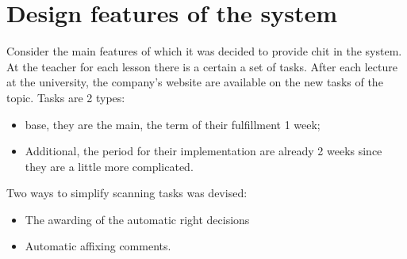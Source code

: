 \documentclass{acmtog} %
\begin{document}
\section{Design features of the system}
\label{sec:design_features}

Consider the main features of which it was decided to provide
chit in the system. At the teacher for each lesson there is a certain
a set of tasks. After each lecture at the university, the company's website
are available on the new tasks of the topic. Tasks are 2 types:
\begin{itemize}
    \item base, they are the main, the term of their fulfillment 1 week;
    \item Additional, the period for their implementation are already 2 weeks since
they are a little more complicated.
\end{itemize}
Two ways to simplify scanning tasks was devised:
\begin{itemize}
    \item The awarding of the automatic right decisions
    \item Automatic affixing comments.
\end{itemize}
\end{document}
